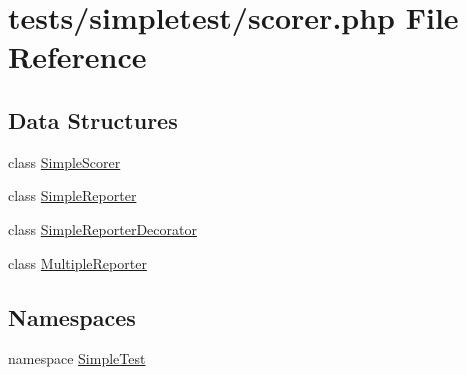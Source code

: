 \hypertarget{scorer_8php}{\section{tests/simpletest/scorer.php File Reference}
\label{scorer_8php}
}
\subsection*{Data Structures}
\begin{DoxyCompactItemize}
\item 
class \hyperlink{class_simple_scorer}{Simple\-Scorer}
\item 
class \hyperlink{class_simple_reporter}{Simple\-Reporter}
\item 
class \hyperlink{class_simple_reporter_decorator}{Simple\-Reporter\-Decorator}
\item 
class \hyperlink{class_multiple_reporter}{Multiple\-Reporter}
\end{DoxyCompactItemize}
\subsection*{Namespaces}
\begin{DoxyCompactItemize}
\item 
namespace \hyperlink{namespace_simple_test}{Simple\-Test}
\end{DoxyCompactItemize}
